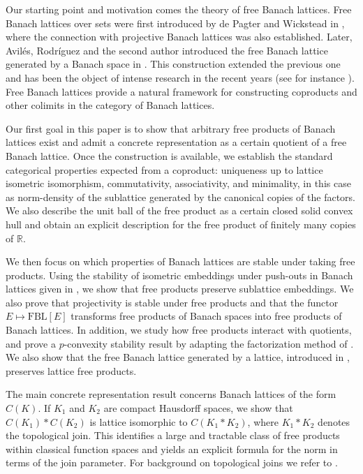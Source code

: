 \documentclass[12pt]{amsart}
\newcommand{\FBL}{\mathrm{FBL}}
\theoremstyle{plain}
\theoremstyle{definition}
\begin{document}
Our starting point and motivation comes the theory of free Banach lattices. Free Banach lattices over sets were first introduced by de Pagter and Wickstead in \cite{projfree}, where the connection with projective Banach lattices was also established. Later, Avil\'es, Rodr\'iguez and the second author introduced the free Banach lattice generated by a Banach space in \cite{freebasico}. This construction extended the previous one and has been the object of intense research in the recent years (see for instance \cite{freebanlatlatproj, freebanlatlat, deHeviaTradacete2023ComplexFBL, GarciaSanchezLeungTaylorTradacete2025UpperP, JardonLaustsenTaylorTradaceteTroitsky2022Convexity, Oikhberg2024Geometry, freebanlat}). Free Banach lattices  provide a natural framework for constructing coproducts and other colimits in the category of Banach lattices.

Our first goal in this paper is to show that arbitrary free products of Banach lattices exist and admit a concrete representation as a certain quotient of a free Banach lattice. Once the construction is available, we establish the standard categorical properties expected from a coproduct: uniqueness up to lattice isometric isomorphism, commutativity, associativity, and minimality, in this case as norm-density of the sublattice generated by the canonical copies of the factors. We also describe the unit ball of the free product as a certain closed solid convex hull and obtain an explicit description for the free product of finitely many copies of $\mathbb{R}$.

We then focus on which properties of Banach lattices are stable under taking free products. Using the stability of isometric embeddings under push-outs in Banach lattices given in \cite{amalg}, we show that free products preserve sublattice embeddings. We also prove that projectivity is stable under free products and that the functor $E \mapsto \FBL[E]$ transforms free products of Banach spaces into free products of Banach lattices. In addition, we study how free products interact with quotients, and prove a $p$-convexity stability result by adapting the factorization method of \cite{factorpconvex}. We also show that the free Banach lattice generated by a lattice, introduced in \cite{freebanlatlat}, preserves lattice free products.

The main concrete representation result concerns Banach lattices of the form $C(K)$. If $K_1$ and $K_2$ are compact Hausdorff spaces, we show that $C(K_1)\ast C(K_2)$ is lattice isomorphic to $C(K_1\ast K_2)$, where $K_1\ast K_2$ denotes the topological join. This identifies a large and tractable class of free products within classical function spaces and yields an explicit formula for the norm in terms of the join parameter. For background on topological joins we refer to \cite{hatcher}.
\end{document}

